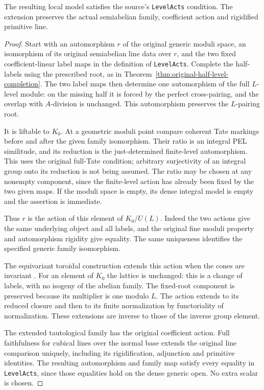 \begin{proposition}
\label{prop:pel-original-level-actions}
The resulting local model satisfies the source's
\texttt{LevelActs} condition.  The extension preserves the actual
semiabelian family, coefficient action and rigidified primitive line.
\end{proposition}
\begin{proof}
Start with an automorphism $r$ of the original generic moduli space,
an isomorphism of its original semiabelian line data over $r$, and
the two fixed coefficient-linear label maps in the definition of
\texttt{LevelActs}.  Complete the half-labels using the prescribed
root, as in Theorem~\ref{thm:original-half-level-completion}.
The two label maps then determine one automorphism of the full
$L$-level module: on the missing half it is forced by the perfect
cross-pairing, and the overlap with $A$-division is unchanged.
This automorphism preserves the $L$-pairing root.

It is liftable to $K_0$.  At a geometric moduli point compare
coherent Tate markings before and after the given family
isomorphism.  Their ratio is an integral PEL similitude, and its
reduction is the just-determined finite-level automorphism.  This
uses the original full-Tate condition; arbitrary surjectivity of
an integral group onto its reduction is not being assumed.
The ratio may be chosen at any nonempty component, since the
finite-level action has already been fixed by the two given maps.
If the moduli space is empty, its dense integral model is empty
and the assertion is immediate.

Thus $r$ is the action of this element of $K_0/U(L)$.  Indeed the
two actions give the same underlying object and all labels, and
the original fine moduli property and automorphism rigidity give
equality.  The same uniqueness identifies the specified generic
family isomorphism.

The equivariant toroidal construction extends this action when
the cones are invariant
\cite[Section 7, especially Proposition 7.3]{level-symmetry-lan-cones}.
For an element of $K_0$ the lattice is unchanged: this is a change
of labels, with no isogeny of the abelian family.  The fixed-root
component is preserved because its multiplier is one modulo $L$.
The action extends to its reduced closure and then to its finite
normalization by functoriality of normalization.  These extensions
are inverse to those of the inverse group element.

The extended tautological family has the original coefficient
action.  Full faithfulness for cubical lines over the normal base
extends the original line comparison uniquely, including its
rigidification, adjunction and primitive identities.  The resulting
automorphism and family map satisfy every equality in
\texttt{LevelActs}, since those equalities hold on the dense
generic open.  No extra scalar is chosen.
\end{proof}

